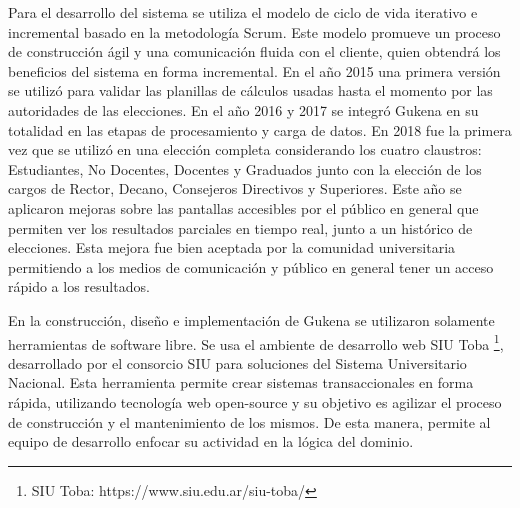 
Para el desarrollo del sistema se utiliza el modelo de ciclo de vida iterativo e incremental basado en la metodología Scrum. Este modelo promueve un proceso de construcción ágil y una comunicación fluida con el cliente, quien obtendrá los beneficios del sistema en forma incremental. En el año 2015 una primera versión se utilizó para validar las planillas de cálculos usadas hasta el momento por las autoridades de las elecciones. En el año 2016 y 2017 se integró Gukena en su totalidad en las etapas de procesamiento y carga de datos.  En 2018 fue la primera vez que se utilizó en una elección completa considerando los cuatro claustros: Estudiantes, No Docentes, Docentes y Graduados junto con la elección de los cargos de Rector, Decano, Consejeros Directivos y Superiores. Este año se aplicaron mejoras sobre las pantallas accesibles por el público en general que permiten ver los resultados parciales en tiempo real, junto a un histórico de elecciones. Esta mejora fue bien aceptada por la comunidad universitaria permitiendo a los medios de comunicación y público en general tener un acceso rápido a los resultados.


En la construcción, diseño e implementación de Gukena se utilizaron solamente herramientas de software libre. Se usa el ambiente de desarrollo web SIU Toba \footnote{SIU Toba: https://www.siu.edu.ar/siu-toba/}, desarrollado por el consorcio SIU para soluciones del Sistema Universitario Nacional. Esta herramienta  permite crear sistemas transaccionales en forma rápida, utilizando tecnología web open-source y su objetivo es agilizar el proceso de construcción y el mantenimiento de los mismos. De esta manera, permite al equipo de desarrollo enfocar su actividad en la lógica del dominio.  

